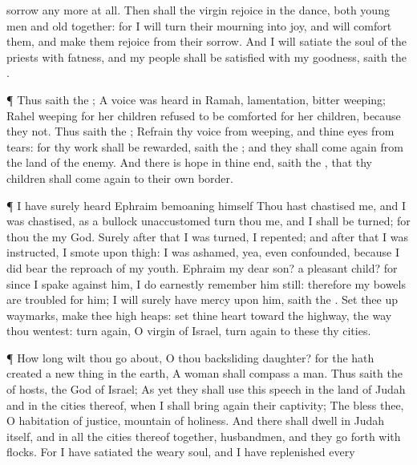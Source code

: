 {sorrow any
more at all.
Then shall the
virgin
rejoice in the
dance, both young
men and
old
together: for I will
turn their
mourning into
joy, and will
comfort them, and make them
rejoice from their
sorrow.
And I will
satiate the
soul of the
priests with
fatness, and my
people shall be
satisfied with my
goodness,
saith the
{}.
\par }{\PP {}¶ Thus
saith the
{}; A
voice was
heard in
Ramah,
lamentation,
{}
bitter
weeping;
Rahel
weeping for her
children
refused to be
comforted for her
children, because they
{} not.
Thus
saith the
{};
Refrain thy
voice from
weeping, and thine
eyes from
tears: for thy
work shall
be
rewarded,
saith the
{}; and they shall come
again from the
land of the
enemy.
And there
is
hope in thine
end,
saith the
{}, that thy
children shall come
again to their own
border.
\par }{\PP {}¶ I have
surely
heard
Ephraim
bemoaning himself
{} Thou hast
chastised me, and I was
chastised, as a
bullock
unaccustomed
{}
turn thou me, and I shall be
turned; for thou
{} the
{} my
God.
Surely
after that I was
turned, I
repented; and
after that I was
instructed, I
smote upon
{}
thigh: I was
ashamed, yea, even
confounded, because I did
bear the
reproach of my
youth.
Ephraim my
dear
son?
{} a
pleasant
child? for
since I
spake against him, I do
earnestly
remember him still: therefore my
bowels are
troubled for him; I will
surely have
mercy upon him,
saith the
{}.
Set thee
up
waymarks,
make thee high
heaps:
set thine
heart toward the
highway,
{} the
way
{} thou
wentest: turn
again, O
virgin of
Israel, turn
again to these thy
cities.
\par }{\PP {}¶ How long wilt thou go
about, O thou
backsliding
daughter? for the
{} hath
created a new
thing in the
earth, A
woman shall
compass a
man.
Thus
saith the
{} of
hosts, the
God of
Israel; As yet they shall
use this
speech in the
land of
Judah and in the
cities thereof, when I shall bring
again their
captivity; The
{}
bless thee, O
habitation of
justice,
{}
mountain of
holiness.
And there shall
dwell in
Judah itself, and in all the
cities thereof
together,
husbandmen, and they
{} go
forth with
flocks.
For I have
satiated the
weary
soul, and I have
replenished every
}
